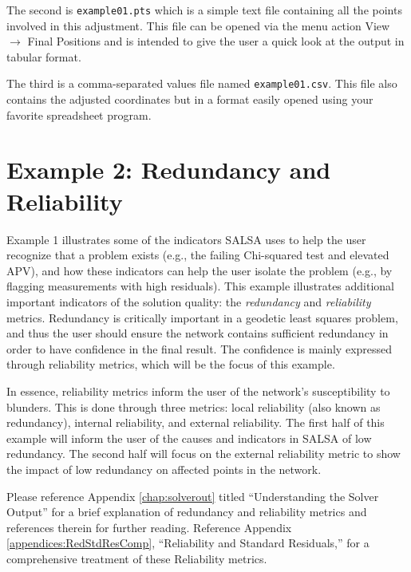 The second is \verb+example01.pts+ which is a simple text file containing all the points involved in this adjustment.  This file can be opened via the menu action View $\to$ Final Positions and is intended to give the user a quick look at the output in tabular format.

The third is a comma-separated values file named \verb+example01.csv+.  This file also contains the adjusted coordinates but in a format easily opened using your favorite spreadsheet program.


\section{Example 2: Redundancy and Reliability}

Example 1 illustrates some of the indicators SALSA uses to help the user recognize that a problem exists (e.g., the failing Chi-squared test and elevated APV), and how these indicators can help the user isolate the problem (e.g., by flagging measurements with high residuals). This example illustrates additional important indicators of the solution quality: the \emph{redundancy} and \emph{reliability} metrics. Redundancy is critically important in a geodetic least squares problem, and thus the user should ensure the network contains sufficient redundancy in order to have confidence in the final result. The confidence is mainly expressed through reliability metrics, which will be the focus of this example. 

In essence, reliability metrics inform the user of the network's susceptibility to blunders. This is done through three metrics: local reliability (also known as redundancy), internal reliability, and external reliability. The first half of this example will inform the user of the causes and indicators in SALSA of low redundancy. The second half will focus on the external reliability metric to show the impact of low redundancy on affected points in the network.

Please reference Appendix \ref{chap:solverout} titled ``Understanding the Solver Output'' for a brief explanation of redundancy and reliability metrics and references therein for further reading. Reference Appendix \ref{appendices:RedStdResComp}, ``Reliability and Standard Residuals,'' for a comprehensive treatment of these Reliability metrics.

